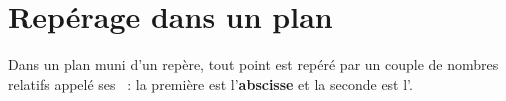 \newpage


\section{Repérage dans un plan}

\vspace{3em}

\begin{definition}
Dans un plan muni d'un repère, tout point est repéré par un couple de nombres relatifs appelé ses  : la première est l'\textbf{abscisse} et la seconde est l'.
\end{definition}

\vspace{3em}

